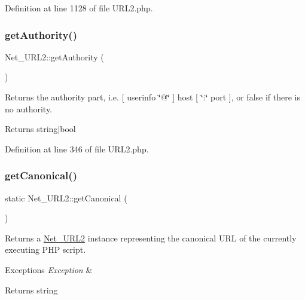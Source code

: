 Definition at line 1128 of file U\+R\+L2.\+php.

\hypertarget{classNet__URL2_af736dde13f102618a706c1cb47868b38}{}\label{classNet__URL2_af736dde13f102618a706c1cb47868b38} 
\subsubsection{\texorpdfstring{get\+Authority()}{getAuthority()}}
{\footnotesize\ttfamily Net\+\_\+\+U\+R\+L2\+::get\+Authority (\begin{DoxyParamCaption}{ }\end{DoxyParamCaption})}

Returns the authority part, i.\+e. \mbox{[} userinfo \char`\"{}@\char`\"{} \mbox{]} host \mbox{[} \char`\"{}\+:\char`\"{} port \mbox{]}, or false if there is no authority.

\begin{DoxyReturn}{Returns}
string$\vert$bool 
\end{DoxyReturn}


Definition at line 346 of file U\+R\+L2.\+php.

\hypertarget{classNet__URL2_ae11b6a2c904b4d60e63d75a1bfe508a9}{}\label{classNet__URL2_ae11b6a2c904b4d60e63d75a1bfe508a9} 
\subsubsection{\texorpdfstring{get\+Canonical()}{getCanonical()}}
{\footnotesize\ttfamily static Net\+\_\+\+U\+R\+L2\+::get\+Canonical (\begin{DoxyParamCaption}{ }\end{DoxyParamCaption})\hspace{0.3cm}{\ttfamily [static]}}

Returns a \hyperlink{classNet__URL2}{Net\+\_\+\+U\+R\+L2} instance representing the canonical U\+RL of the currently executing P\+HP script.


\begin{DoxyExceptions}{Exceptions}
{\em Exception} & \\
\hline
\end{DoxyExceptions}
\begin{DoxyReturn}{Returns}
string 
\end{DoxyReturn}



